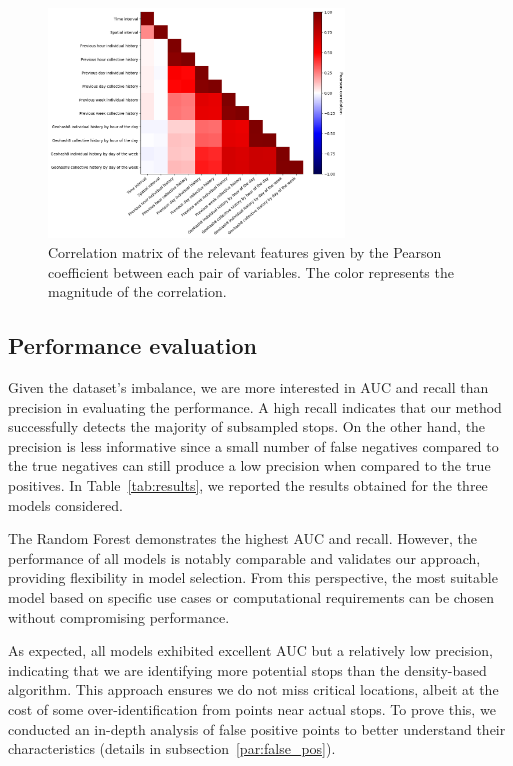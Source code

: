 \documentclass{article}
\begin{document}
\begin{figure}[t!]
        \hspace{15mm}
\includegraphics[width=0.7\textwidth]{./Images/correlation_matrix.png}
	\caption{Correlation matrix of the relevant features given by the Pearson coefficient between each pair of variables. The color represents the magnitude of the correlation.}
	\label{fig:correlation_matrix}
\end{figure}



\subsection{Performance evaluation}\label{par:performance}

Given the dataset's imbalance, we are more interested in AUC and recall than precision in evaluating the performance. A high recall indicates that our method successfully detects the majority of subsampled stops. On the other hand, the precision is less informative since a small number of false negatives compared to the true negatives can still produce a low precision when compared to the true positives.
In Table~\ref{tab:results}, we reported the results obtained for the three models considered.

The Random Forest demonstrates the highest AUC and recall. However, the performance of all models is notably comparable and validates our approach, providing flexibility in model selection. From this perspective, the most suitable model based on specific use cases or computational requirements can be chosen without compromising performance. 

As expected, all models exhibited excellent AUC but a relatively low precision, indicating that we are identifying more potential stops than the density-based algorithm. This approach ensures we do not miss critical locations, albeit at the cost of some over-identification from points near actual stops. To prove this, we conducted an in-depth analysis of false positive points to better understand their characteristics (details in subsection~\ref{par:false_pos}). 
\end{document}
